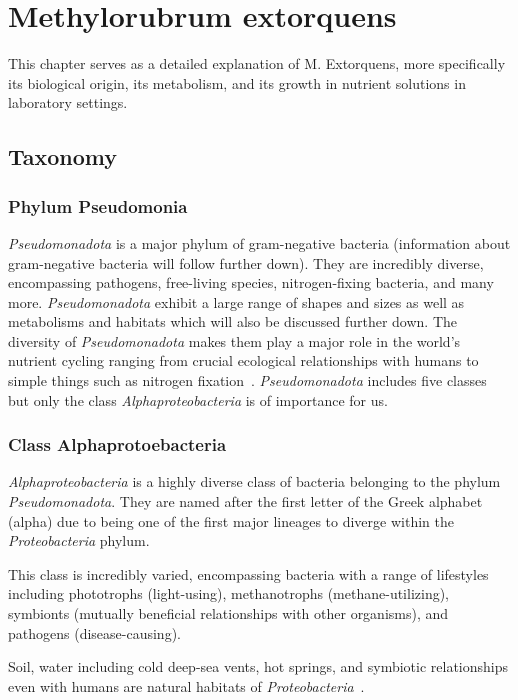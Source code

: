 \section{Methylorubrum extorquens}
This chapter serves as a detailed explanation of M. Extorquens, more specifically its biological
origin, its metabolism, and its growth in nutrient solutions in laboratory settings.

\subsection{Taxonomy\authorB{}}

\subsubsection{Phylum Pseudomonia}
\emph{Pseudomonadota} is a major phylum of gram-negative bacteria (information about gram-negative bacteria will follow further down).
They are incredibly diverse, encompassing
pathogens, free-living species, nitrogen-fixing bacteria, and many more.
\emph{Pseudomonadota} exhibit a large range of shapes and sizes as well as metabolisms and
habitats which will also be discussed further down.
The diversity of \emph{Pseudomonadota} makes them play a major role in the world's nutrient cycling ranging from crucial ecological relationships with humans to simple things such as nitrogen fixation~\cite{pseudomonadota}.
\emph{Pseudomonadota} includes five classes but only the class \emph{Alphaproteobacteria} is of importance for us.

\subsubsection{Class Alphaprotoebacteria}
\emph{Alphaproteobacteria} is a highly diverse class of bacteria belonging to the phylum \emph{Pseudomonadota}.
They are named after the first letter of the Greek alphabet (alpha) due to being one of the first major lineages to diverge within the \emph{Proteobacteria} phylum.

This class is incredibly varied, encompassing bacteria with a range of lifestyles including phototrophs (light-using), methanotrophs (methane-utilizing), symbionts (mutually beneficial relationships with other organisms), and pathogens (disease-causing).

Soil, water including cold deep-sea vents, hot springs, and symbiotic relationships even
with humans are natural habitats of \emph{Proteobacteria}~\cite{gammaproteobacteria}.

